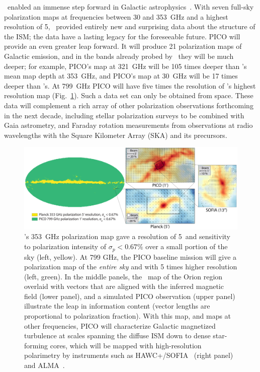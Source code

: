 \documentclass[PICOAPC.tex]{subfiles}
\begin{document}
\planck\ enabled an immense step forward in Galactic astrophysics~\citep{Planck2018:XII}. With seven full-sky polarization maps at frequencies between 30 and 353~GHz and a highest resolution of 5\arcmin, \planck\ provided entirely new and surprising data about the structure of the \ac{ISM}; the data have a lasting legacy for the foreseeable future. PICO will provide an even greater leap forward. It will produce 21 polarization maps of Galactic emission, and in the bands already probed by \planck\ they will be much deeper; for example, PICO's map at 321~GHz will be 105 times deeper than \planck's mean map depth at 353~GHz, and PICO's map at 30~GHz will be 17 times deeper than \planck's.  At 799~GHz PICO will have five times the resolution of \planck 's highest resolution map (Fig.~\ref{fig:allsky}). Such a data set can only be obtained from space. These data will complement a rich array of other polarization observations forthcoming in the next decade, including stellar polarization surveys to be combined with Gaia astrometry, and Faraday rotation measurements from  observations at radio wavelengths with the  Square Kilometer Array (SKA) and its precursors.
\begin{figure}[ht]
    \centering
    \includegraphics[width=6.5in]{galsci_fig_v4.pdf}
\vspace{-0.25in}
    \caption{\captiontext  \planck 's 353~GHz polarization map gave a resolution of 5\arcmin~and sensitivity to polarization intensity of $\sigma_{p} < 0.67\%$ over a small portion of the sky (left, yellow).  At 799 GHz, the PICO baseline mission will give a polarization map of the {\it entire sky} and with 5 times higher resolution (left, green). In the middle panels, the \planck~map of the Orion region overlaid with vectors that are aligned with the inferred magnetic field (lower panel), and a simulated PICO observation (upper panel) illustrate the leap in information content (vector lengths are proportional to polarization fraction). With this map, and maps at other frequencies, PICO will characterize Galactic magnetized turbulence at scales spanning the diffuse ISM down to dense star-forming cores, which will be mapped with high-resolution polarimetry by instruments such as HAWC+/SOFIA~\citep{Chuss2018} (right panel) and ALMA~\citep{Bacciotti2018ApJ}.
    \label{fig:allsky} }
\vspace{-0.10in}
\end{figure}
\end{document}
